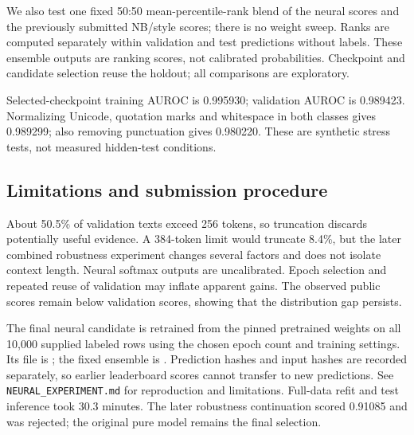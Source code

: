 We also test one fixed 50:50 mean-percentile-rank blend of the neural scores and the previously submitted NB/style scores; there is no weight sweep. Ranks are computed separately within validation and test predictions without labels. These ensemble outputs are ranking scores, not calibrated probabilities. Checkpoint and candidate selection reuse the holdout; all comparisons are exploratory.

Selected-checkpoint training AUROC is 0.995930; validation AUROC is 0.989423. Normalizing Unicode, quotation marks and whitespace in both classes gives 0.989299; also removing punctuation gives 0.980220. These are synthetic stress tests, not measured hidden-test conditions.

\subsection*{Limitations and submission procedure}
About 50.5\% of validation texts exceed 256 tokens, so truncation discards potentially useful evidence. A 384-token limit would truncate 8.4\%, but the later combined robustness experiment changes several factors and does not isolate context length. Neural softmax outputs are uncalibrated. Epoch selection and repeated reuse of validation may inflate apparent gains. The observed public scores remain below validation scores, showing that the distribution gap persists.

The final neural candidate is retrained from the pinned pretrained weights on all 10,000 supplied labeled rows using the chosen epoch count and training settings. Its file is ; the fixed ensemble is . Prediction hashes and input hashes are recorded separately, so earlier leaderboard scores cannot transfer to new predictions. See \texttt{NEURAL\_EXPERIMENT.md} for reproduction and limitations. Full-data refit and test inference took 30.3 minutes. The later robustness continuation scored 0.91085 and was rejected; the original pure model remains the final selection.
\endgroup
\newpage
\begingroup\small\setlength{\emergencystretch}{2em}

